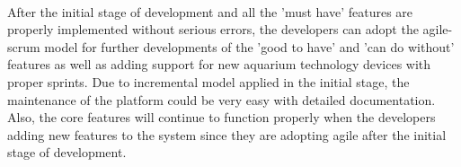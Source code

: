 \documentclass[paper=a4, fontsize=11pt]{scrartcl} %
\numberwithin{equation}{section} %
\numberwithin{figure}{section} %
\numberwithin{table}{section} %
\begin{document}
\paragraph{}After the initial stage of development and all the 'must have' features are properly implemented without serious errors, the developers can adopt the agile-scrum model for further developments of the 'good to have' and 'can do without' features as well as adding support for new aquarium technology devices with proper sprints. Due to incremental model applied in the initial stage, the maintenance of the platform could be very easy with detailed documentation. Also, the core features  will continue to function properly when the developers adding new features to the system since they are adopting agile after the initial stage of development.  


























\end{document}
